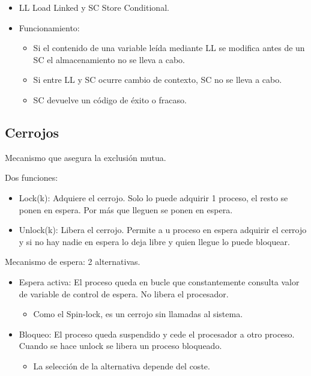 \documentclass[12pt, twoside, openright]{report} %
\begin{document}
    \begin{itemize}
    
    \item
      LL Load Linked y SC Store Conditional.
    \item
      Funcionamiento:

      \begin{itemize}
      
      \item
        Si el contenido de una variable leída mediante LL se modifica
        antes de un SC el almacenamiento no se lleva a cabo.
      \item
        Si entre LL y SC ocurre cambio de contexto, SC no se lleva a
        cabo.
      \item
        SC devuelve un código de éxito o fracaso.
      \end{itemize}
    \end{itemize}

\subsection{Cerrojos}



    Mecanismo que asegura la exclusión mutua.

    Dos funciones:

    \begin{itemize}
    
    \item
      Lock(k): Adquiere el cerrojo. Solo lo puede adquirir 1 proceso,
      el resto se ponen en espera. Por más que lleguen se ponen en
      espera.
    \item
      Unlock(k): Libera el cerrojo. Permite a u proceso en espera
      adquirir el cerrojo y si no hay nadie en espera lo deja libre y
      quien llegue lo puede bloquear.
    \end{itemize}

    Mecanismo de espera: 2 alternativas.

    \begin{itemize}
    
    \item
      Espera activa: El proceso queda en bucle que constantemente
      consulta valor de variable de control de espera. No libera el
      procesador.

      \begin{itemize}
      
      \item
        Como el Spin-lock, es un cerrojo sin llamadas al sistema.
      \end{itemize}
    \item
      Bloqueo: El proceso queda suspendido y cede el procesador a otro
      proceso. Cuando se hace unlock se libera un proceso bloqueado.

      \begin{itemize}
      
      \item
        La selección de la alternativa depende del coste.
      \end{itemize}
    \end{itemize}
\end{document}
